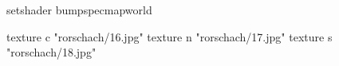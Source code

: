 setshader bumpspecmapworld

    texture c "rorschach/16.jpg"
    texture n "rorschach/17.jpg"
    texture s "rorschach/18.jpg"
